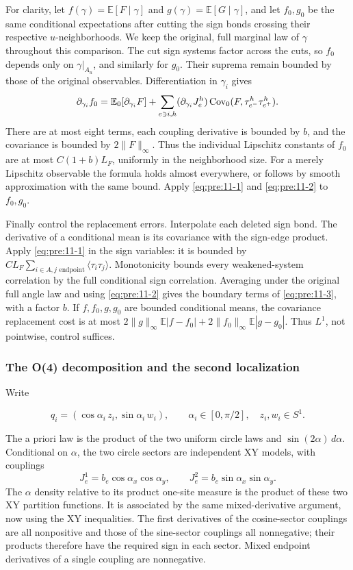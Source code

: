For clarity, let \(f(\gamma)=\mathbb E[F\mid\gamma]\) and
\(g(\gamma)=\mathbb E[G\mid\gamma]\), and let \(f_0,g_0\) be the same
conditional expectations after cutting the sign bonds crossing their
respective \(u\)-neighborhoods. We keep the original, full marginal law of
\(\gamma\) throughout this comparison. The cut sign systems factor across
the cuts, so \(f_0\) depends only on \(\gamma|_{A_u}\), and similarly for
\(g_0\). Their suprema remain bounded by those of the original observables.
Differentiation in \(\gamma_i\) gives
\[
 \partial_{\gamma_i}f_0
 =\mathbb E_0[\partial_{\gamma_i}F]
  +\sum_{e\ni i,h}(\partial_{\gamma_i}J_e^h)
                 \operatorname{Cov}_0(F,\tau^h_{e^-}\tau^h_{e^+}).
\]
There are at most eight terms, each coupling derivative is bounded by \(b\),
and the covariance is bounded by \(2\|F\|_\infty\). Thus the individual
Lipschitz constants of \(f_0\) are at most \(C(1+b)L_F\), uniformly in the
neighborhood size. For a merely Lipschitz observable the formula holds
almost everywhere, or follows by smooth approximation with the same
bound. Apply \eqref{eq:pre:11-1} and \eqref{eq:pre:11-2} to \(f_0,g_0\).

Finally control the replacement errors. Interpolate each deleted sign bond. The derivative of a conditional mean is its covariance with the sign-edge product. Apply \eqref{eq:pre:11-1} in the sign variables: it is bounded by
\(CL_F\sum_{i\in A,j\text{ endpoint}}\langle\tau_i\tau_j\rangle\).
Monotonicity bounds every weakened-system correlation by the full conditional sign correlation. Averaging under the original full angle law and using \eqref{eq:pre:11-2} gives the boundary terms of \eqref{eq:pre:11-3}, with a factor \(b\). If \(f,f_0,g,g_0\) are bounded conditional means, the covariance replacement cost is at most \(2\|g\|_\infty\mathbb E|f-f_0|+2\|f_0\|_\infty\mathbb E|g-g_0|\). Thus \(L^1\), not pointwise, control suffices.

\subsubsection{The O(4) decomposition and the second localization}\label{pre:part-11-3}

Write

\[
q_i=(\cos\alpha_i\,z_i,\sin\alpha_i\,w_i),\qquad
\alpha_i\in[0,\pi/2],\quad z_i,w_i\in S^1.
\]

The a priori law is the product of the two uniform circle laws and
\(\sin(2\alpha)\,d\alpha\). Conditional on \(\alpha\), the two circle
sectors are independent XY models, with couplings
\[
 J_e^1=b_e\cos\alpha_x\cos\alpha_y,\qquad
 J_e^2=b_e\sin\alpha_x\sin\alpha_y.
\]
The \(\alpha\) density relative to its product one-site measure is the
product of these two XY partition functions. It is associated by the same
mixed-derivative argument, now using the XY inequalities. The first
derivatives of the cosine-sector couplings are all nonpositive and those
of the sine-sector couplings all nonnegative; their products therefore
have the required sign in each sector. Mixed endpoint derivatives of a
single coupling are nonnegative.

